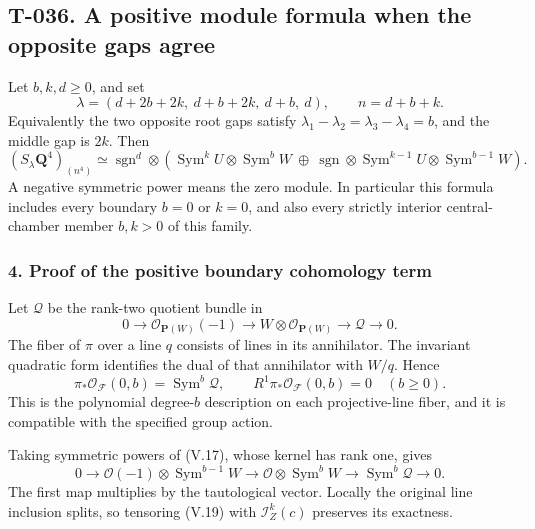 \documentclass[
  10pt,
]{article}
\begin{document}
\subsection{T-036. A positive module formula when the opposite gaps
agree}\label{t-036.-a-positive-module-formula-when-the-opposite-gaps-agree}

Let \(b,k,d\ge0\), and set \[
\lambda=(d+2b+2k,\ d+b+2k,\ d+b,\ d),\qquad n=d+b+k.
\tag{V.15}
\] Equivalently the two opposite root gaps satisfy
\(\lambda_1-\lambda_2=\lambda_3-\lambda_4=b\), and the middle gap is
\(2k\). Then \[
\boxed{
(S_\lambda\mathbf Q^4)_{(n^4)}
\simeq\operatorname{sgn}^{d}\otimes
\left(
\operatorname{Sym}^{k}U\otimes\operatorname{Sym}^{b}W
\ \oplus\
\operatorname{sgn}\otimes
\operatorname{Sym}^{k-1}U\otimes\operatorname{Sym}^{b-1}W
\right).}
\tag{V.16}
\] A negative symmetric power means the zero module. In particular this
formula includes every boundary \(b=0\) or \(k=0\), and also every
strictly interior central-chamber member \(b,k>0\) of this family.

\subsubsection{4. Proof of the positive boundary cohomology
term}\label{proof-of-the-positive-boundary-cohomology-term}

Let \(\mathcal Q\) be the rank-two quotient bundle in \[
0\to\mathcal O_{\mathbf P(W)}(-1)\to
W\otimes\mathcal O_{\mathbf P(W)}\to\mathcal Q\to0.
\tag{V.17}
\] The fiber of \(\pi\) over a line \(q\) consists of lines in its
annihilator. The invariant quadratic form identifies the dual of that
annihilator with \(W/q\). Hence \[
\pi_*\mathcal O_{\mathcal F}(0,b)=\operatorname{Sym}^b\mathcal Q,
\qquad
R^1\pi_*\mathcal O_{\mathcal F}(0,b)=0
\quad(b\ge0).
\tag{V.18}
\] This is the polynomial degree-\(b\) description on each
projective-line fiber, and it is compatible with the specified group
action.

Taking symmetric powers of (V.17), whose kernel has rank one, gives \[
0\to\mathcal O(-1)\otimes\operatorname{Sym}^{b-1}W
\to\mathcal O\otimes\operatorname{Sym}^{b}W
\to\operatorname{Sym}^{b}\mathcal Q\to0.
\tag{V.19}
\] The first map multiplies by the tautological vector. Locally the
original line inclusion splits, so tensoring (V.19) with
\(\mathcal I_Z^k(c)\) preserves its exactness.
\end{document}
